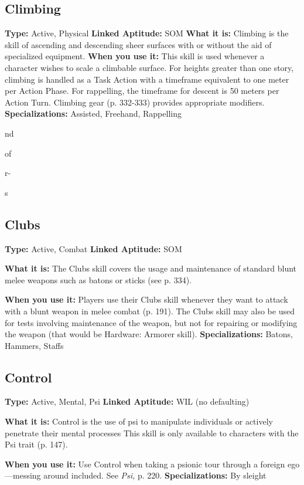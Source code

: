 \subsection{Climbing}

\textbf{Type:} Active, Physical
\textbf{Linked Aptitude:} SOM
\textbf{What it is:} Climbing is the skill of ascending and 
descending sheer surfaces with or without the aid of 
specialized equipment.
\textbf{When you use it:} This skill is used whenever a character
wishes to scale a climbable surface. For heights
greater than one story, climbing is handled as a Task 
Action with a timeframe equivalent to one meter per 
Action Phase. For rappelling, the timeframe for descent
is 50 meters per Action Turn. Climbing gear (p.
332-333) provides appropriate modifiers.
\textbf{Specializations:} Assisted, Freehand, Rappelling

nd

of

r-

s

\subsection{Clubs}

\textbf{Type:} Active, Combat
\textbf{Linked Aptitude:} SOM

\textbf{What it is:} The Clubs skill covers the usage and 
maintenance of standard blunt melee weapons such 
as batons or sticks (see p. 334).

\textbf{When you use it:} Players use their Clubs skill whenever
they want to attack with a blunt weapon in melee
combat (p. 191). The Clubs skill may also be used for 
tests involving maintenance of the weapon, but not 
for repairing or modifying the weapon (that would be 
Hardware: Armorer skill).
\textbf{Specializations:} Batons, Hammers, Staffs

\subsection{Control}

\textbf{Type:} Active, Mental, Psi
\textbf{Linked Aptitude:} WIL (no defaulting)

\textbf{What it is:} Control is the use of psi to manipulate 
individuals or actively penetrate their mental processes
This skill is only available to characters with
the Psi trait (p. 147).

\textbf{When you use it:} Use Control when taking a psionic 
tour through a foreign ego—messing around included. 
See \textit{Psi,} p. 220.
\textbf{Specializations:} By sleight

